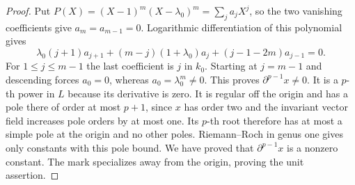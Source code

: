 \documentclass[a4paper,11pt]{article}
\theoremstyle{definition}
\theoremstyle{remark}
\numberwithin{equation}{section}
\begin{document}
\begin{proof}
Put \(P(X)=(X-1)^m(X-\lambda_0)^m=\sum_j a_jX^j\), so the two
vanishing coefficients give \(a_m=a_{m-1}=0\). Logarithmic
differentiation of this polynomial gives
\[
  \lambda_0(j+1)a_{j+1}+(m-j)(1+\lambda_0)a_j
                         +(j-1-2m)a_{j-1}=0 .
\]
For \(1\le j\le m-1\) the last coefficient is \(j\) in \(k_0\).
Starting at \(j=m-1\) and descending forces \(a_0=0\), whereas
\(a_0=\lambda_0^m\ne0\). This proves \(\partial^{p-1}x\ne0\).
It is a \(p\)-th power in \(L\) because its derivative is zero.
It is regular off the origin and has a pole there of order at
most \(p+1\), since \(x\) has order two and the invariant vector
field increases pole orders by at most one. Its \(p\)-th root
therefore has at most a simple pole at the origin and no other
poles. Riemann--Roch in genus one gives only constants with this
pole bound. We have proved that \(\partial^{p-1}x\) is a nonzero
constant. The mark specializes away from the origin, proving the
unit assertion.
\end{proof}
\end{document}
